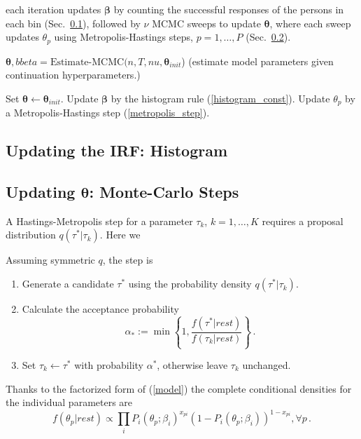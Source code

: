 \documentclass{article}
\newcommand{\ta}{\theta}
\newcommand{\bbeta}{\boldsymbol\beta}
\newcommand{\bta}{\boldsymbol\ta}
\newcommand{\lla}{\longleftarrow}
\begin{document}
each iteration updates $\bbeta$ by counting the successful responses of the persons in each bin (Sec.~\ref{histogram}), followed by $\nu$ MCMC sweeps to update $\bta$, where each sweep updates $\ta_p$ using Metropolis-Hastings steps, $p=1,\dots,P$ (Sec.~\ref{metropolis}).
\begin{algorithm}
\caption{$\bta, bbeta = {\mbox{Estimate-MCMC}}(n, T, nu, \bta_{init}$)
(estimate model parameters given continuation hyperparameters.)}
\label{mcmc}
\begin{algorithmic}
    \STATE Set $\bta \lla \bta_{init}$.
    	\STATE Update $\bbeta$ by the histogram rule (\ref{histogram_const}).
	    		\STATE Update $\theta_p$ by a Metropolis-Hastings step (\ref{metropolis_step}).
	    	\ENDFOR
    	\ENDFOR
    \ENDWHILE
\end{algorithmic}
\end{algorithm}

\subsection{Updating the IRF: Histogram}
\label{histogram}

\subsection{Updating $\bta$: Monte-Carlo Steps}
\label{metropolis}
A Hastings-Metropolis step for a parameter $\tau_k$, $k=1,\dots,K$ requires a proposal distribution $q(\tau^*|\tau_k)$. Here we 

Assuming symmetric $q$, the step is
\begin{enumerate}
	\item Generate a candidate $\tau^*$ using the probability density $q(\tau^*|\tau_k)$.
	\item Calculate the acceptance probability
	\begin{equation}
		\alpha_* := \min\left\{1, \frac{f(\tau^*|rest)}{f(\tau_k|rest)} \right\}\,.
	\end{equation}
	\item Set $\tau_k \leftarrow \tau^*$ with probability $\alpha^*$, otherwise leave $\tau_k$ unchanged.
\end{enumerate}

Thanks to the factorized form of (\ref{model}) the complete conditional densities for the individual parameters are
\begin{equation}
  f(\ta_p|rest) \propto \prod_i 
  P_i(\ta_p;\beta_i)^{x_{pi}}\left(1 - P_i(\ta_p;\beta_i)\right)^{1-x_{pi}},\forall p\,.
  \label{cond_ta}
\end{equation}
\end{document}
